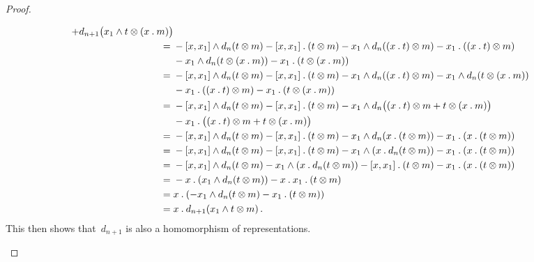 \begin{proof}
\begin{enumerate}
\begin{align*}
        + d_{n+1}\bigl( x_1 \wedge t \otimes (x \mathbin{.} m) \bigr)
        \\
        ={}&
        - [x, x_1] \wedge d_n(t \otimes m)
        - [x, x_1] \mathbin{.} (t \otimes m)
        - x_1 \wedge d_n( (x \mathbin{.} t) \otimes m )
        - x_1 \mathbin{.} ( (x \mathbin{.} t) \otimes m )
        \\
        {}&
        - x_1 \wedge d_n( t \otimes (x \mathbin{.} m) )
        - x_1 \mathbin{.} ( t \otimes (x \mathbin{.} m) )
        \\
        ={}&
        - [x, x_1] \wedge d_n(t \otimes m)
        - [x, x_1] \mathbin{.} (t \otimes m)
        - x_1 \wedge d_n( (x \mathbin{.} t) \otimes m )
        - x_1 \wedge d_n( t \otimes (x \mathbin{.} m) )
        \\
        {}&
        - x_1 \mathbin{.} ( (x \mathbin{.} t) \otimes m )
        - x_1 \mathbin{.} ( t \otimes (x \mathbin{.} m) )
        \\
        ={}&
        - [x, x_1] \wedge d_n(t \otimes m)
        - [x, x_1] \mathbin{.} (t \otimes m)
        - x_1 \wedge d_n\bigl( (x \mathbin{.} t) \otimes m + t \otimes (x \mathbin{.} m) \bigr)
        \\
        {}&
        - x_1 \mathbin{.} \bigl( (x \mathbin{.} t) \otimes m + t \otimes (x \mathbin{.} m) \bigr)
        \\
        ={}&
        - [x, x_1] \wedge d_n(t \otimes m)
        - [x, x_1] \mathbin{.} (t \otimes m)
        - x_1 \wedge d_n( x \mathbin{.} (t \otimes m) )
        - x_1 \mathbin{.} ( x \mathbin{.} (t \otimes m) )
        \\
        ={}&
        - [x, x_1] \wedge d_n(t \otimes m)
        - [x, x_1] \mathbin{.} (t \otimes m)
        - x_1 \wedge ( x \mathbin{.} d_n(t \otimes m) )
        - x_1 \mathbin{.} ( x \mathbin{.} (t \otimes m) )
        \\
        ={}&
        - [x, x_1] \wedge d_n(t \otimes m)
        - x_1 \wedge ( x \mathbin{.} d_n(t \otimes m) )
        - [x, x_1] \mathbin{.} (t \otimes m)
        - x_1 \mathbin{.} ( x \mathbin{.} (t \otimes m) )
        \\
        ={}&
        - x \mathbin{.} ( x_1 \wedge d_n(t \otimes m) )
        - x \mathbin{.} x_1 \mathbin{.} (t \otimes m)
        \\
        ={}&
        x \mathbin{.} ( - x_1 \wedge d_n(t \otimes m) - x_1 \mathbin{.} (t \otimes m) )
        \\
        ={}&
        x \mathbin{.} d_{n+1}( x_1 \wedge t \otimes m ) \,.
      \end{align*}
      This then shows that~$d_{n+1}$ is also a homomorphism of representations.


\end{enumerate}
\end{proof}
